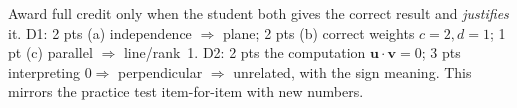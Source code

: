 \documentclass[10pt]{article}
\newcommand{\vv}{\mathbf{v}}
\newcommand{\uu}{\mathbf{u}}
\begin{document}
\begin{teachernote}
Award full credit only when the student both gives the correct result and \emph{justifies} it.
D1: 2 pts (a) independence $\Rightarrow$ plane; 2 pts (b) correct weights $c=2,d=1$; 1 pt (c)
parallel $\Rightarrow$ line/rank~1. D2: 2 pts the computation $\uu\cdot\vv=0$; 3 pts interpreting
$0\Rightarrow$ perpendicular $\Rightarrow$ unrelated, with the sign meaning. This mirrors the
practice test item-for-item with new numbers.
\end{teachernote}
\end{document}
